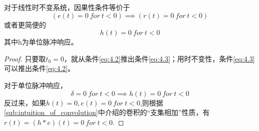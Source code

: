 \begin{proposition}
对于线性时不变系统，因果性条件等价于
\begin{equation}
    \left(e(t)=0\ for\ t<0\right)\implies \left(r(t)=0\ for\ t<0\right)\label{eq:4.3}
\end{equation}
或者更简便的
\begin{equation}
    h(t)=0\ for\ t<0\label{eq:4.4}
\end{equation}
其中h为单位脉冲响应。
\end{proposition}
\begin{proof}
只要取$t_0=0$，就从条件\ref{eq:4.2}推出条件\ref{eq:4.3}；用时不变性，条件\ref{eq:4.3}可以推出条件\ref{eq:4.2}。

对于单位脉冲响应，
$$\delta=0\ for\ t<0\implies h(t)=0\ for\ t<0$$
反过来，如果$h(t)=0,e(t)=0\ for\ t<0$,则根据\ref{sub:intuition_of_convolution}中介绍的卷积的“支集相加”性质，有$r(t)=(h*e)(t)=0\ for\ t<0$.
\end{proof}
